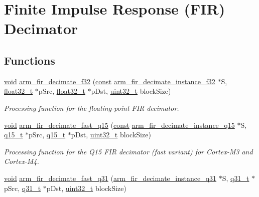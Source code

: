 \hypertarget{group___f_i_r__decimate}{\section{Finite Impulse Response (F\-I\-R) Decimator}
\label{group___f_i_r__decimate}
}
\subsection*{Functions}
\begin{DoxyCompactItemize}
\item 
\hyperlink{group___n_a_m_e_ga18028b8badbf1ea7e704ccac3c488e82}{void} \hyperlink{group___f_i_r__decimate_ga25aa3d58a90bf91b6a82272a0bc518f7}{arm\-\_\-fir\-\_\-decimate\-\_\-f32} (\hyperlink{group___n_a_m_e_ga7ae6d0e43244213b34de2c2b9aa30da6}{const} \hyperlink{structarm__fir__decimate__instance__f32}{arm\-\_\-fir\-\_\-decimate\-\_\-instance\-\_\-f32} $\ast$S, \hyperlink{arm__math_8h_a4611b605e45ab401f02cab15c5e38715}{float32\-\_\-t} $\ast$p\-Src, \hyperlink{arm__math_8h_a4611b605e45ab401f02cab15c5e38715}{float32\-\_\-t} $\ast$p\-Dst, \hyperlink{stdint_8h_a435d1572bf3f880d55459d9805097f62}{uint32\-\_\-t} block\-Size)
\begin{DoxyCompactList}\small\item\em Processing function for the floating-\/point F\-I\-R decimator. \end{DoxyCompactList}\item 
\hyperlink{group___n_a_m_e_ga18028b8badbf1ea7e704ccac3c488e82}{void} \hyperlink{group___f_i_r__decimate_ga3f434c9a5d3b4e68061feac0714ea2ac}{arm\-\_\-fir\-\_\-decimate\-\_\-fast\-\_\-q15} (\hyperlink{group___n_a_m_e_ga7ae6d0e43244213b34de2c2b9aa30da6}{const} \hyperlink{structarm__fir__decimate__instance__q15}{arm\-\_\-fir\-\_\-decimate\-\_\-instance\-\_\-q15} $\ast$S, \hyperlink{arm__math_8h_ab5a8fb21a5b3b983d5f54f31614052ea}{q15\-\_\-t} $\ast$p\-Src, \hyperlink{arm__math_8h_ab5a8fb21a5b3b983d5f54f31614052ea}{q15\-\_\-t} $\ast$p\-Dst, \hyperlink{stdint_8h_a435d1572bf3f880d55459d9805097f62}{uint32\-\_\-t} block\-Size)
\begin{DoxyCompactList}\small\item\em Processing function for the Q15 F\-I\-R decimator (fast variant) for Cortex-\/\-M3 and Cortex-\/\-M4. \end{DoxyCompactList}\item 
\hyperlink{group___n_a_m_e_ga18028b8badbf1ea7e704ccac3c488e82}{void} \hyperlink{group___f_i_r__decimate_ga3c18cc3d0548a410c577f1bead9582b7}{arm\-\_\-fir\-\_\-decimate\-\_\-fast\-\_\-q31} (\hyperlink{structarm__fir__decimate__instance__q31}{arm\-\_\-fir\-\_\-decimate\-\_\-instance\-\_\-q31} $\ast$S, \hyperlink{arm__math_8h_adc89a3547f5324b7b3b95adec3806bc0}{q31\-\_\-t} $\ast$p\-Src, \hyperlink{arm__math_8h_adc89a3547f5324b7b3b95adec3806bc0}{q31\-\_\-t} $\ast$p\-Dst, \hyperlink{stdint_8h_a435d1572bf3f880d55459d9805097f62}{uint32\-\_\-t} block\-Size)

\end{DoxyCompactItemize}
